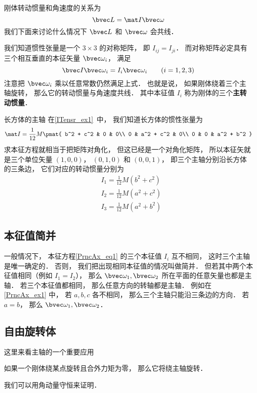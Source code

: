 
\begin{issues}
\issueDraft
\end{issues}


刚体转动惯量和角速度的关系为
\begin{equation}
\bvec L = \mat I \bvec \omega
\end{equation}
我们下面来讨论什么情况下 $\bvec L$ 和 $\bvec \omega$ 会共线．

我们知道惯性张量是一个 $3\times 3$ 的对称矩阵， 即 $I_{ij} = I_{ji}$． 而对称矩阵必定具有三个相互垂直的本征矢量 $\bvec \omega_i$， 满足
\begin{equation}\label{PrncAx_eq1}
\bvec I \bvec \omega_i = I_i \bvec \omega_i \qquad (i = 1,2,3)
\end{equation}
注意把 $\bvec \omega_i$ 乘以任意常数仍然满足上式． 也就是说， 如果刚体绕着三个主轴旋转， 那么它的转动惯量与角速度共线． 其中本征值 $I_i$ 称为刚体的三个\textbf{主转动惯量}．

\begin{example}{长方体的主轴}\label{PrncAx_ex1}
在\autoref{ITensr_ex1}~中， 我们知道长方体的惯性张量为
\begin{equation}
\mat I = \frac{1}{12} M
\pmat{
   b^2 + c^2 & 0 & 0\\
   0 & a^2 + c^2 & 0\\
   0 & 0 & a^2 + b^2
}
\end{equation}
求本征方程就相当于把矩阵对角化， 但这已经是一个对角化矩阵， 所以本征矢就是三个单位矢量 $(1,0,0)$， $(0,1,0)$ 和 $(0,0,1)$， 即三个主轴分别沿长方体的三条边， 它们对应的转动惯量分别为
\begin{equation}
\begin{aligned}
&I_1 = \frac{1}{12}M(b^2+c^2)\\
&I_2 = \frac{1}{12}M(a^2+c^2)\\
&I_3 = \frac{1}{12}M(a^2+b^2)
\end{aligned}
\end{equation}
\end{example}

\subsection{本征值简并}
一般情况下， 本征方程\autoref{PrncAx_eq1} 的三个本征值 $I_i$ 互不相同， 这时三个主轴是唯一确定的． 否则， 我们把出现相同本征值的情况叫做简并． 但若其中两个本征值相同（例如 $I_1 = I_2$）， 那么 $\bvec \omega_1, \bvec \omega_2$ 所在平面的任意矢量也都是主轴． 若三个本征值都相同， 那么任意方向的转轴都是主轴． 例如在\autoref{PrncAx_ex1} 中， 若 $a,b,c$ 各不相同， 那么三个主轴只能沿三条边的方向． 若 $a = b$， 那么 $\bvec \omega_1, \bvec \omega_2$．

\subsection{自由旋转体}
这里来看主轴的一个重要应用
\begin{theorem}{}
如果一个刚体绕某点旋转且合外力矩为零， 那么它将绕主轴旋转．
\end{theorem}
我们可以用角动量守恒来证明．
